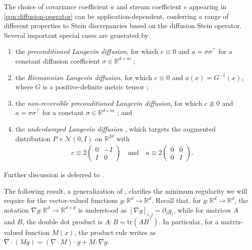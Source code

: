 \documentclass[12pt,paper=letter]{scrreprt}
\newcommand{\qtext}[1]{\quad\text{#1}\quad}
\def\reals{\mathbb{R}} %
\newcommand{\Gsn}{\mathcal{N}}
\begin{document}
The choice of covariance coefficient $a$ and stream coefficient $c$ appearing in \cref{eqn:diffusion-operator} can be application-dependent, conferring a range of different properties to Stein discrepancies based on the diffusion Stein operator.
Several important special cases are generated by 
\begin{enumerate}
\item the \emph{preconditioned Langevin diffusion}, for which $c \equiv 0$ and $a=\sigma\sigma^\top$ for a constant diffusion coefficient $\sigma\in\reals^{d\times m}$  \citep{stuart2004conditional}; 
\item the \emph{Riemannian Langevin diffusion}, for which $c \equiv 0$ and $a(x) = G^{-1}(x)$, where $G$ is a positive-definite metric tensor \citep{patterson2013stochastic,xifara2014langevin,ma2015complete};
\item the \emph{non-reversible preconditioned Langevin diffusion}, for which $c \not\equiv 0$ and $a=\sigma\sigma^\top$ for a constant  $\sigma\in\reals^{d\times m}$ \citep{ma2015complete,duncan2016variance,rey2014irreversible}; and
\item the \emph{underdamped Langevin diffusion} \citep{horowitz1987second}, which targets the augmented distribution $P \times \Gsn(0,I)$ on $\reals^{2d}$ with 
\begin{align*}
c\equiv 2
\begin{pmatrix}
0 & -I \\
I & 0 
\end{pmatrix}
\qtext{and}
a\equiv 2
\begin{pmatrix}
0 & 0 \\
0 & I
\end{pmatrix}.
\end{align*}
\end{enumerate}
Further discussion is deferred to .


The following result, a generalization of \citet[][Proposition 3]{Gorham2019}, clarifies the minimum regularity we will require for the vector-valued functions $g : \reals^d \rightarrow \reals^d$.
Recall that, for $g : \mathbb{R}^d \rightarrow \mathbb{R}^d$, the notation $\nabla g : \mathbb{R}^d \rightarrow \mathbb{R}^{d \times d}$ is understood as $[\nabla g]_{i,j} = \partial_j g_i$, while for matrices $A$ and $B$, the double dot product is $A:B = \mathrm{tr}(AB^\top)$.
In particular, for a matrix-valued function $M(x)$, the product rule writes as $\nabla \cdot (Mg) = (\nabla \cdot M) \cdot g + M : \nabla g$.
\end{document}
